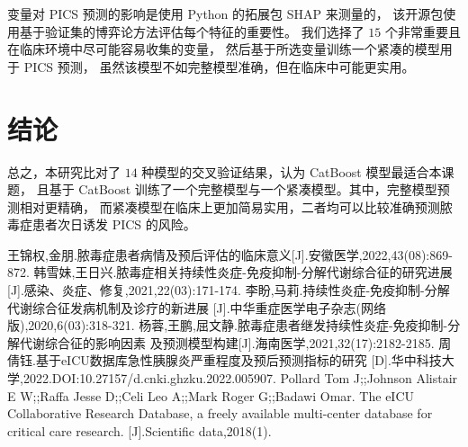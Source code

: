 \documentclass[12pt,titlepage]{article}
\begin{document}
变量对 PICS 预测的影响是使用 Python 的拓展包 SHAP 来测量的，%
该开源包使用基于验证集的博弈论方法评估每个特征的重要性。%
我们选择了 $15$ 个非常重要且在临床环境中尽可能容易收集的变量，%
然后基于所选变量训练一个紧凑的模型用于 PICS 预测，%
虽然该模型不如完整模型准确，但在临床中可能更实用。





\section{结论}

总之，本研究比对了 $14$ 种模型的交叉验证结果，认为 CatBoost 模型最适合本课题，%
且基于 CatBoost 训练了一个完整模型与一个紧凑模型。其中，完整模型预测相对更精确，%
而紧凑模型在临床上更加简易实用，二者均可以比较准确预测脓毒症患者次日诱发 PICS 的风险。


\appendix
\begin{thebibliography}{9}
    王锦权,金朋.脓毒症患者病情及预后评估的临床意义[J].安徽医学,2022,43(08):869-872.
    韩雪妹,王日兴.脓毒症相关持续性炎症-免疫抑制-分解代谢综合征的研究进展%
    [J].感染、炎症、修复,2021,22(03):171-174.
    李盼,马莉.持续性炎症-免疫抑制-分解代谢综合征发病机制及诊疗的新进展%
    [J].中华重症医学电子杂志(网络版),2020,6(03):318-321.
    杨蓉,王鹏,屈文静.脓毒症患者继发持续性炎症-免疫抑制-分解代谢综合征的影响因素%
    及预测模型构建[J].海南医学,2021,32(17):2182-2185.
    周倩钰.基于eICU数据库急性胰腺炎严重程度及预后预测指标的研究%
    [D].华中科技大学,2022.DOI:10.27157/d.cnki.ghzku.2022.005907.
    Pollard Tom J;;Johnson Alistair E W;;Raffa Jesse D;;Celi Leo A;;Mark Roger G;;Badawi Omar.
    The eICU Collaborative Research Database, a freely available multi-center database for critical care research.
        [J].Scientific data,2018(1).
\end{thebibliography}
\end{document}
